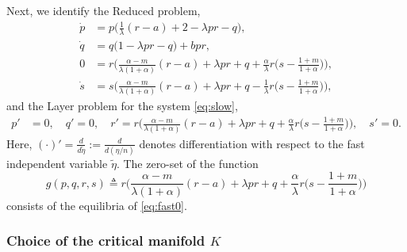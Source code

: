 \documentclass[usletter,11pt]{article}
\theoremstyle{remark}
\begin{document}
Next, we identify the Reduced problem,
\begin{equation}\label{eq:slow0} \tag{R}
 \begin{aligned}
 \dot{p} &=p\Big(\frac{1}{\lambda}({r}-a) + 2- \lambda p {r} -q\Big),\\%
 \dot{q} &=q\Big(1 -\lambda p {r} -q\Big) + b p {r},\\%
 0&=r\Big(\frac{\alpha-m}{\lambda(1+\alpha)}(r-a) + \lambda pr + q +\frac{\alpha}{\lambda}r\big(s- \frac{1+m}{1+\alpha}\big)\Big),\\
 \dot{s} &=s\Big(\frac{\alpha-m}{\lambda(1+\alpha)}({r}-a) + \lambda p{r} + q - \frac{1}{\lambda}{r}\big(s- \frac{1+m}{1+\alpha}\big)\Big),%
 \end{aligned}
\end{equation}
and the Layer problem for the system \eqref{eq:slow},
\begin{equation} \label{eq:fast0} 
 \begin{aligned}
 {p}' &=0, \quad {q}' =0, \quad {r}' =r\Big(\frac{\alpha-m}{\lambda(1+\alpha)}(r-a) + \lambda pr + q +\frac{\alpha}{\lambda}r\big(s- \frac{1+m}{1+\alpha}\big)\Big),  \quad{s}' =0 .
 \end{aligned}
\end{equation}
Here, $(\cdot)'= \frac{d}{d\tilde{\eta}} := \frac{d}{d(\eta/n)}$ denotes differentiation with respect to the fast independent variable $\tilde{\eta}$. The zero-set  of
the function 
\begin{equation}
g(p,q,r,s) \triangleq r\Big(\frac{\alpha-m}{\lambda(1+\alpha)}(r-a) + \lambda pr + q +\frac{\alpha}{\lambda}r\big(s- \frac{1+m}{1+\alpha}\big)\Big)\label{eq:zeroset} 
\end{equation}
consists of the equilibria of \eqref{eq:fast0}. 

\subsubsection{Choice of the critical manifold $K$} \label{sec:choice}
\end{document}
